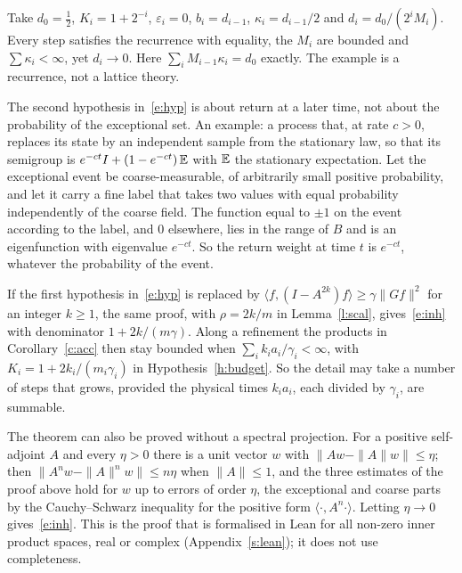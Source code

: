\begin{remark}\label{r:budget}
Take $d_0=\tfrac12$, $K_i=1+2^{-i}$, $\varepsilon_i=0$, $b_i=d_{i-1}$, $\kappa_i=d_{i-1}/2$ and
$d_i=d_0/(2^iM_i)$. Every step satisfies the recurrence with equality, the $M_i$ are bounded and
$\sum\kappa_i<\infty$, yet $d_i\to0$. Here $\sum_iM_{i-1}\kappa_i=d_0$ exactly. The example is a recurrence,
not a lattice theory.
\end{remark}

\begin{remark}\label{r:reset}
The second hypothesis in~\eqref{e:hyp} is about return at a later time, not about the probability of the
exceptional set. An example: a process that, at rate $c>0$, replaces its state by an independent sample from
the stationary law, so that its semigroup is $e^{-ct}I+(1-e^{-ct})\,\mathbb{E}$ with $\mathbb{E}$ the stationary expectation.
Let the exceptional event be coarse-measurable, of arbitrarily small positive probability, and let it carry
a fine label that takes two values with equal probability independently of the coarse field. The function equal to $\pm1$ on the event according to the label, and $0$ elsewhere,
lies in the range of $B$ and is an eigenfunction with eigenvalue $e^{-ct}$. So the return weight at time $t$ is
$e^{-ct}$, whatever the probability of the event.
\end{remark}

\begin{remark}\label{r:lag}
If the first hypothesis in~\eqref{e:hyp} is replaced by $\langle f,(I-A^{2k})f\rangle\ge\gamma\|Gf\|^2$ for an
integer $k\ge1$, the same proof, with $\rho=2k/m$ in Lemma~\ref{l:scal}, gives~\eqref{e:inh} with denominator
$1+2k/(m\gamma)$. Along a refinement the products in Corollary~\ref{c:acc} then stay bounded when
$\sum_ik_ia_i/\gamma_i<\infty$, with $K_i=1+2k_i/(m_i\gamma_i)$ in Hypothesis~\ref{h:budget}. So the detail may take a number of steps that
grows, provided the physical times $k_ia_i$, each divided by $\gamma_i$, are summable.
\end{remark}

\begin{remark}\label{r:second}
The theorem can also be proved without a spectral projection. For a positive self-adjoint $A$ and every
$\eta>0$ there is a unit vector $w$ with $\|Aw-\|A\|w\|\le\eta$; then $\|A^nw-\|A\|^nw\|\le n\eta$ when
$\|A\|\le1$, and the three estimates of the proof above hold for $w$ up to errors of order $\eta$, the
exceptional and coarse parts by the Cauchy--Schwarz inequality for the positive form
$\langle\cdot,A^n\cdot\rangle$. Letting $\eta\to0$ gives~\eqref{e:inh}. This is the proof that is formalised
in Lean for all non-zero inner product spaces, real or complex (Appendix~\ref{s:lean}); it does not use
completeness.
\end{remark}

